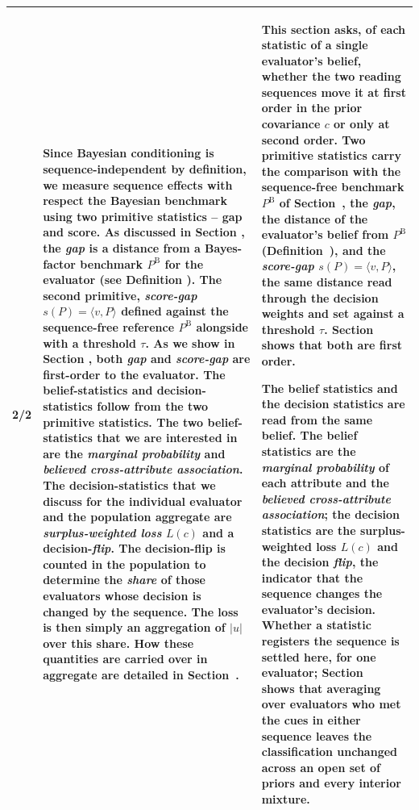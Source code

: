 \documentclass[10pt]{article}
\theoremstyle{definition}
\newcommand{\PB}{P^{\mathrm{B}}}
\newcommand{\vv}{v}
\renewcommand{\ref}[1]{\textsc{\detokenize{#1}}}
\begin{document}
{\begin{longtable}{|p{0.9cm}|p{12.2cm}|p{12.2cm}|}
2/2 & Since Bayesian conditioning is sequence-independent by definition, we measure sequence effects with respect the Bayesian benchmark using two \textbf{primitive} statistics -- gap and score. As discussed in Section \ref{sec:jeffrey}, the \emph{gap} is a distance from a Bayes-factor benchmark $\PB$ for the evaluator (see Definition \ref{def:indgap}). The second primitive, \emph{score-gap} $s(P)=\langle\vv,P\rangle$ defined against the sequence-free reference $\PB$ alongside with a threshold $\tau$. As we show in Section \ref{sec:individual_primitives}, both \emph{gap} and \emph{score-gap} are first-order to the evaluator. The belief-statistics and decision-statistics follow from the two primitive statistics. The two \textbf{belief-statistics} that we are interested in are the \emph{marginal probability} and \emph{believed cross-attribute association}. The \textbf{decision-statistics} that we discuss for the individual evaluator and the population aggregate are \emph{surplus-weighted loss} $L(c)$ and a decision-\emph{flip}. The decision-flip is counted in the population to determine the \emph{share} of those evaluators whose decision is changed by the sequence. The loss is then simply an aggregation of $|u|$ over this share. How these quantities are carried over in aggregate are detailed in Section~\ref{sec:aggregation}. & This section asks, of each statistic of a single evaluator's belief, whether the two reading sequences move it at first order in the prior covariance $c$ or only at second order. Two primitive statistics carry the comparison with the sequence-free benchmark $\PB$ of Section~\ref{sec:jeffrey}, the \emph{gap}, the distance of the evaluator's belief from $\PB$ (Definition~\ref{def:indgap}), and the \emph{score-gap} $s(P)=\langle\vv,P\rangle$, the same distance read through the decision weights and set against a threshold $\tau$. Section~\ref{sec:individual_primitives} shows that both are first order. \par The belief statistics and the decision statistics are read from the same belief. The belief statistics are the \emph{marginal probability} of each attribute and the \emph{believed cross-attribute association}; the decision statistics are the surplus-weighted loss $L(c)$ and the decision \emph{flip}, the indicator that the sequence changes the evaluator's decision. Whether a statistic registers the sequence is settled here, for one evaluator; Section~\ref{sec:aggregation} shows that averaging over evaluators who met the cues in either sequence leaves the classification unchanged across an open set of priors and every interior mixture. \\ \hline

\end{longtable}}
\end{document}
